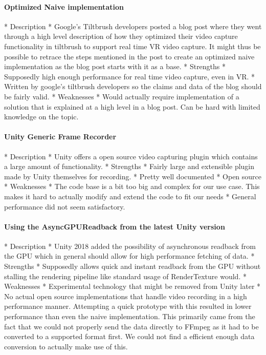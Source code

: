 \paragraph{Optimized Naive implementation}
        * Description
            * Google's Tiltbrush developers posted a blog post where they went through a high level description of how they optimized their video capture functionality in tiltbrush to support real time VR video capture. It might thus be possible to retrace the steps mentioned in the post to create an optimized naive implementation as the blog post starts with it as a base. 
        * Strengths
            * Supposedly high enough performance for real time video capture, even in VR.
            * Written by google's tiltbrush developers so the claims and data of the blog should be fairly valid. 
        * Weaknesses
            * Would actually require implementation of a solution that is explained at a high level in a blog post. Can be hard with limited knowledge on the topic. 
\paragraph{Unity Generic Frame Recorder}
        * Description
            * Unity offers a open source video capturing plugin which contains a large amount of functionality. 
        * Strengths
            * Fairly large and extensible plugin made by Unity themselves for recording. 
            * Pretty well documented
            * Open source
        * Weaknesses
            * The code base is a bit too big and complex for our use case. This makes it hard to actually modify and extend the code to fit our needs 
            * General performance did not seem satisfactory. 
\paragraph{Using the AsyncGPUReadback from the latest Unity version}
        * Description
            * Unity 2018 added the possibility of asynchronous readback from the GPU which in general should allow for high performance fetching of data. 
        * Strengths
            * Supposedly allows quick and instant readback from the GPU without stalling the rendering pipeline like standard usage of RenderTexture would. 
        * Weaknesses
            * Experimental technology that might be removed from Unity later
            * No actual open source implementations that handle video recording in a high performance manner. Attempting a quick prototype with this resulted in lower performance than even the naive implementation. This primarily came from the fact that we could not properly send the data directly to FFmpeg as it had to be converted to a supported format first. We could not find a efficient enough data conversion to actually make use of this. 
